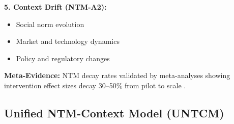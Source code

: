 \documentclass[11pt, a4paper]{article}
\begin{document}
\begin{tcolorbox}[colback=gray!5!white, colframe=gray!75!black,
    title=\textbf{Scientific Evidence for NTM Components}]
\vspace{0.5em}
\textbf{5. Context Drift (NTM-A2):}
\begin{itemize}[nosep]
\item Social norm evolution \citep{bicchieri2005grammar, cialdini2004social}
\item Market and technology dynamics \citep{PAP-rogers2003diffusion}
\item Policy and regulatory changes \citep{thaler2008nudge, sunstein2014nudging}
\end{itemize}

\textbf{Meta-Evidence:} NTM decay rates validated by meta-analyses showing intervention effect sizes decay 30--50\% from pilot to scale \citep{hummel2019effective, dellavigna2022rcts, soman2020successfully}.

\end{tcolorbox}



\subsection{Unified NTM-Context Model (UNTCM)}
\label{subsec:untcm}
\end{document}
